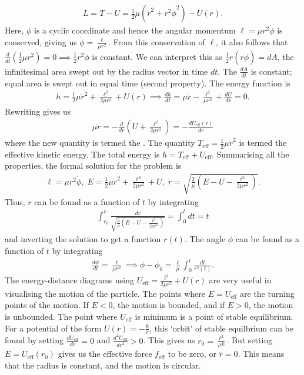 \begin{align}
    L = T-U = \frac{1}{2}\mu(\dot{r}^{2} + r^{2}\dot{\phi}^{2}) - U(r).
\end{align}
Here, $\phi$ is a cyclic coordinate and hence the angular momentum $\ell = \mu r^{2}\dot{\phi}$ is conserved, giving us $\dot{\phi} = \frac{\ell}{\mu r^{2}}$. From this conservation of $\ell$, it also follows that $\frac{d}{dt}(\frac{1}{2}\mu r^{2}) = 0 \implies \frac{1}{2}r^{2}\dot{\phi}$ is constant. We can interpret this as $\frac{1}{2}r(r\dot{\phi}) = dA$, the infinitesimal area swept out by the radius vector in time $dt$. The  $\frac{dA}{dt}$ is constant; equal area is swept out in equal time (second property). The energy function is
\begin{align}
    h = \frac{1}{2}\mu\dot{r}^{2} + \frac{\ell^{2}}{2\mu r^{2}} + U(r) \implies \frac{dh}{dt} = \mu\ddot{r} - \frac{\ell^{2}}{\mu r^{3}} + \frac{dU}{dr} = 0.
\end{align}
Rewriting gives us
\begin{align}
    \mu\ddot{r} = -\frac{d}{dr}\left( U + \frac{\ell^{2}}{2\mu r^{2}} \right) = -\frac{dU_{\text{eff}}(r)}{dr}
\end{align}
where the new quantity is termed the . The quantity $T_{\text{eff}} = \frac{1}{2}\mu\dot{r}^{2}$ is termed the effective kinetic energy. The total energy is $h = T_{\text{eff}} + U_{\text{eff}}$. Summarising all the properties, the formal solution for the problem is
\begin{align}
    \ell = \mu r^{2}\dot{\phi},\; E=\frac{1}{2}\mu \dot{r}^{2} + \frac{\ell^{2}}{2\mu r^{2}} + U,\; \dot{r} = \sqrt{\frac{2}{\mu}\left( E-U-\frac{\ell^{2}}{2 \mu r^{2}} \right)}.
\end{align}
Thus, $r$ can be found as a function of $t$ by integrating
\begin{align}
    \int_{r_{0}}^{r} \frac{dr}{\sqrt{\frac{2}{\mu}\left( E-U-\frac{\ell^{2}}{2 \mu r^{2}} \right)}} = \int_{0}^{t} dt = t
\end{align}
and inverting the solution to get a function $r(t)$. The angle $\phi$ can be found as a function of $t$ by integrating
\begin{align}
    \frac{d\phi}{dt} = \frac{\ell}{\mu r^{2}} \implies \phi - \phi_{0} = \frac{\ell}{\mu}\int_{0}^{t} \frac{dt}{r^{2}(t)}.
\end{align}
The energy-distance diagrams using $U_{\text{eff}} = \frac{l^{2}}{2\mu r^{2}} + U(r)$ are very useful in visualising the motion of the particle. The points where $E = U_{\text{eff}}$ are the turning points of the motion. If $E < 0$, the motion is bounded, and if $E > 0$, the motion is unbounded. The point where $U_{\text{eff}}$ is minimum is a point of stable equilibrium. For a potential of the form $U(r) = -\frac{k}{r}$, this `orbit' of stable equilbrium can be found by setting $\frac{dU_{\text{eff}}}{dr} = 0$ and $\frac{d^{2}U_{\text{eff}}}{dr^{2}} > 0$. This gives us $r_{0} = \frac{\ell^{2}}{\mu k}$. But setting $E = U_{\text{eff}}(r_{0})$ gives us the effective force $f_{\text{eff}}$ to be zero, or $\ddot{r} = 0$. This means that the radius is constant, and the motion is circular.

